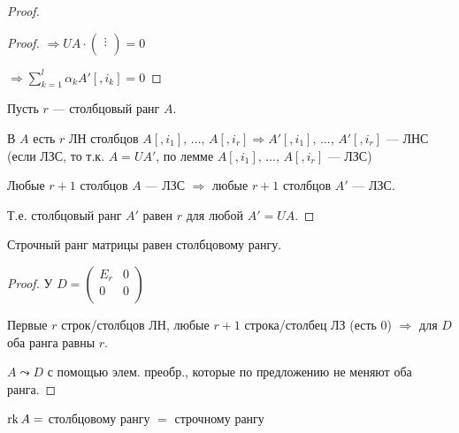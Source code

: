 \begin{theorem-non}
\begin{proof}
\begin{lemma}
\begin{proof}
                $\Longrightarrow UA \cdot
                \begin{pmatrix}
                    \vdots\\
                \end{pmatrix}
                = 0$

                $\Longrightarrow \sum_{k=1}^l \alpha_k A'[, i_k] = 0$

            \end{proof}
        \end{lemma}

        Пусть $r$ --- столбцовый ранг $A$. 
        
        В $A$ есть $r$ ЛН столбцов $A[, i_1],\, \dots,\, A[, i_r] \Longrightarrow A'[, i_1],\, \dots,\, A'[, i_r]$ --- ЛНС 
        (если ЛЗС, то т.к. $A = UA'$, по лемме $A[, i_1],\, \dots,\, A[, i_r]$ --- ЛЗС)

        Любые $r+1$ столбцов $A$ --- ЛЗС $\Longrightarrow$ любые $r+1$ столбцов $A'$ --- ЛЗС.

        Т.е. столбцовый ранг $A'$ равен $r$ для любой $A'=UA$.

    \end{proof}
\end{theorem-non}

\follow Строчный ранг матрицы равен столбцовому рангу.
\begin{proof}
    
    У $D = 
    \begin{pmatrix}
        E_r & 0\\
        0   & 0\\
    \end{pmatrix}$

    Первые $r$ строк/столбцов ЛН, любые $r+1$ строка/столбец ЛЗ (есть 0) $\Longrightarrow$ для $D$ оба ранга равны $r$.

    $A \leadsto D$ с помощью элем. преобр., которые по предложению не меняют оба ранга.

\end{proof}

$\operatorname{rk} A =$ столбцовому рангу $=$ строчному рангу
